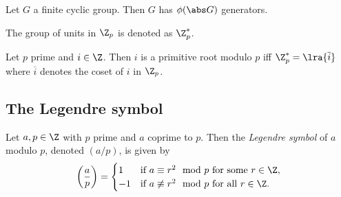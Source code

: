 \documentclass{article}
\begin{document}
\begin{corollary}
	Let $G$ a finite cyclic group. Then $G$ has $\phi(\abs G)$ generators.
\end{corollary}

\begin{definition}
	The group of units in $\Z_p$ is denoted as $\Z_p^*$.
\end{definition}

\begin{theorem}
	Let $p$ prime and $i\in\Z$. Then $i$ is a primitive root modulo $p$ iff
	$\Z_p^*=\lra{\overline i}$ where $\overline i$ denotes the coset of $i$ in
	$\Z_p$.
\end{theorem}

\subsection{The Legendre symbol}

\begin{definition}
	Let $a,p\in\Z$ with $p$ prime and $a$ coprime to $p$.
	Then the \emph{Legendre symbol} of $a$ modulo $p$, denoted $(a/p)$, is given by
	\begin{align*}
		\left(\frac{a}{p}\right)=\begin{cases}
			                         1  & \text{if }a\equiv r^2\mod p\text{ for some $r\in\Z$},    \\
			                         -1 & \text{if }a\not\equiv r^2\mod p\text{ for all $r\in\Z$}.
		                         \end{cases}
	\end{align*}
\end{definition}
\end{document}

